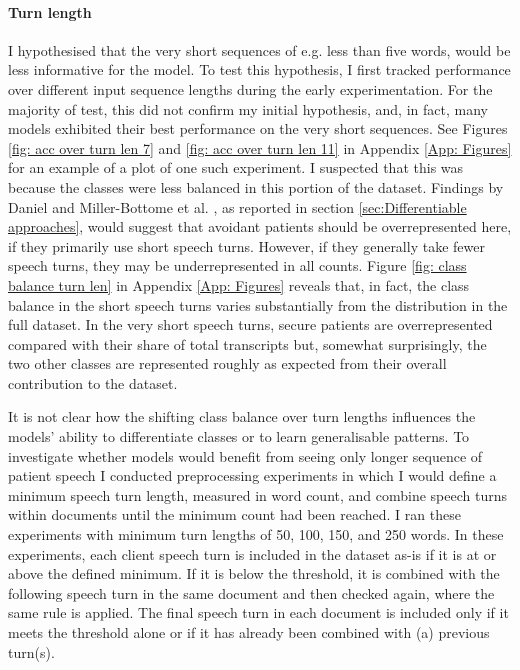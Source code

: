 \documentclass[12pt]{report}
\begin{document}
\paragraph*{Turn length}
I hypothesised that the very short sequences of e.g. less than five words, would be less informative for the model.
To test this hypothesis, I first tracked performance over different input sequence lengths during the early experimentation.
For the majority of test, this did not confirm my initial hypothesis, and, in fact, many models exhibited their best performance on the very short sequences.
See Figures \ref{fig: acc over turn len 7} and \ref{fig: acc over turn len 11} in Appendix \ref{App: Figures} for an example of a plot of one such experiment.
I suspected that this was because the classes were less balanced in this portion of the dataset.
Findings by Daniel \citeyear{Daniel2011} and Miller-Bottome et al. \citeyear{MillerBottome2018}, as reported in section \ref{sec:Differentiable approaches}, would suggest that avoidant patients should be overrepresented here, if they primarily use short speech turns.
However, if they generally take fewer speech turns, they may be underrepresented in all counts.
Figure \ref{fig: class balance turn len} in Appendix \ref{App: Figures} reveals that, in fact, the class balance in the short speech turns varies substantially from the distribution in the full dataset.
In the very short speech turns, secure patients are overrepresented compared with their share of total transcripts but, somewhat surprisingly, the two other classes are represented roughly as expected from their overall contribution to the dataset.

It is not clear how the shifting class balance over turn lengths influences the models' ability to differentiate classes or to learn generalisable patterns.
To investigate whether models would benefit from seeing only longer sequence of patient speech I conducted preprocessing experiments in which I would define a minimum speech turn length, measured in word count, and combine speech turns within documents until the minimum count had been reached.
I ran these experiments with minimum turn lengths of 50, 100, 150, and 250 words.
In these experiments, each client speech turn is included in the dataset as-is if it is at or above the defined minimum.
If it is below the threshold, it is combined with the following speech turn in the same document and then checked again, where the same rule is applied.
The final speech turn in each document is included only if it meets the threshold alone or if it has already been combined with (a) previous turn(s).
\end{document}
